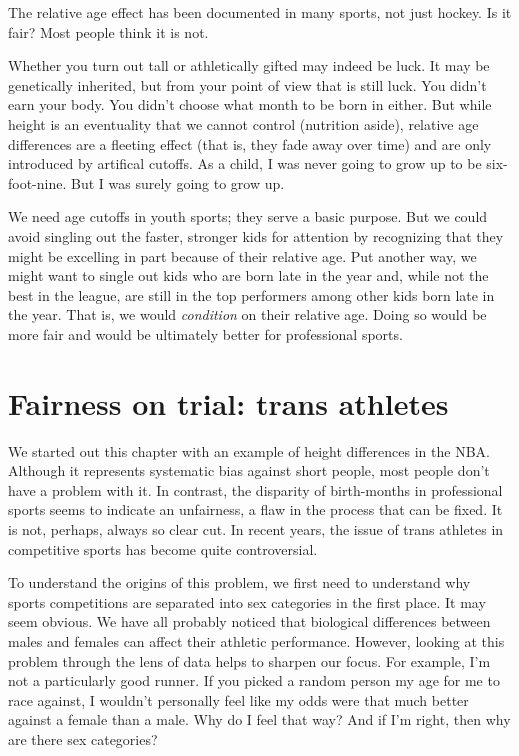 \documentclass[openany]{book}
\begin{document}
The relative age effect has been documented in many sports, not just hockey. Is it fair? Most people think it is not.

Whether you turn out tall or athletically gifted may indeed be luck. It may be genetically inherited, but from your point of view that is still luck. You didn't earn your body. You didn't choose what month to be born in either. But while height is an eventuality that we cannot control (nutrition aside), relative age differences are a fleeting effect (that is, they fade away over time) and are only introduced by artifical cutoffs. As a child, I was never going to grow up to be six-foot-nine. But I was surely going to grow up.

We need age cutoffs in youth sports; they serve a basic purpose. But we could avoid singling out the faster, stronger kids for attention by recognizing that they might be excelling in part because of their relative age. Put another way, we might want to single out kids who are born late in the year and, while not the best in the league, are still in the top performers among other kids born late in the year. That is, we would \emph{condition} on their relative age. Doing so would be more fair and would be ultimately better for professional sports.

\hypertarget{fairness-on-trial-trans-athletes}{%
\section*{Fairness on trial: trans athletes}\label{fairness-on-trial-trans-athletes}}

We started out this chapter with an example of height differences in the NBA. Although it represents systematic bias against short people, most people don't have a problem with it. In contrast, the disparity of birth-months in professional sports seems to indicate an unfairness, a flaw in the process that can be fixed. It is not, perhaps, always so clear cut. In recent years, the issue of trans athletes in competitive sports has become quite controversial.

To understand the origins of this problem, we first need to understand why sports competitions are separated into sex categories in the first place. It may seem obvious. We have all probably noticed that biological differences between males and females can affect their athletic performance. However, looking at this problem through the lens of data helps to sharpen our focus. For example, I'm not a particularly good runner. If you picked a random person my age for me to race against, I wouldn't personally feel like my odds were that much better against a female than a male. Why do I feel that way? And if I'm right, then why are there sex categories?
\end{document}
